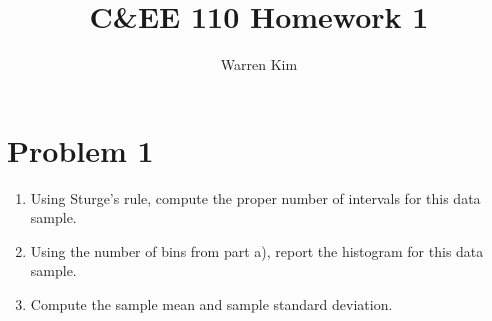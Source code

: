 \documentclass[13pt]{article}
\title{C\&EE 110 Homework 1}
\author{Warren Kim}
\begin{document}
\maketitle

\newpage
\section*{Problem 1}
\begin{enumerate}[label=\alph*)]
\item Using Sturge's rule, compute the proper number of intervals for this data sample.
\item Using the number of bins from part a), report the histogram for this data sample.
\item Compute the sample mean and sample standard deviation.
\end{enumerate}
\end{document}
